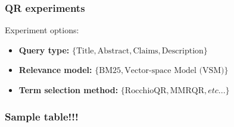 \documentclass[xcolor=x11names,compress]{beamer}
\renewcommand{\(}{\begin{columns}}
\renewcommand{\)}{\end{columns}}
\newcommand{\<}[1]{\begin{column}{#1}}
\renewcommand{\>}{\end{column}}
\begin{document}
\begin{frame}
\frametitle{QR experiments}
Experiment options:
\begin{itemize}
\item \textbf{\footnotesize{}Query type:}{\footnotesize{} $\{\mathrm{Title},\mathrm{Abstract},\mathrm{Claims},\mathrm{Description}\}$ }{\footnotesize \par}
\item \textbf{\footnotesize{}Relevance model:}{\footnotesize{} $\{\mathrm{BM25},\mbox{Vector-space Model (VSM)}\}$ }{\footnotesize \par}
\item \textbf{\footnotesize{}Term selection method:}{\footnotesize{} $\{\mathrm{RocchioQR},\mathrm{MMRQR},etc...\}$ }{\footnotesize \par}
\end{itemize}
\end{frame}


\begin{frame}
\frametitle{Sample table!!!}
\end{frame}
\end{document}
